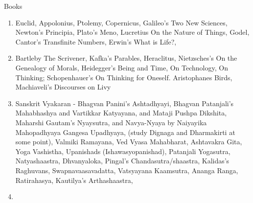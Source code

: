 \documentclass{article}
\begin{document}
Books
\begin{enumerate}
\item Euclid, Appolonius, Ptolemy, Copernicus, Galileo's Two New Sciences, Newton's Principia, Plato's Meno, Lucretius On the Nature of Things, Godel, Cantor's Transfinite Numbers, Erwin's What is Life?, 

\item Bartleby The Scrivener, Kafka's Parables, Heraclitus, Nietzsches's On the Genealogy of Morals, Heidegger's Being and Time, On Technology, On Thinking; Schopenhauer's On Thinking for Oneself. Aristophanes Birds, Machiaveli's Discourses on Livy
\item Sanskrit Vyakaran - Bhagvan Panini's Ashtadhyayi, Bhagvan Patanjali's Mahabhashya and Vartikkar Katyayana, and Mataji Pushpa Dikshita, Maharshi Gautam's Nyaysutra, and Navya-Nyaya by Naiyayika Mahopadhyaya Gangesa Upadhyaya, (study Dignaga and Dharmakirti at some point), Valmiki Ramayana, Ved Vyasa Mahabharat, Ashtavakra Gita, Yoga Vashistha, Upanishads (Ishawasyopanishad), Patanjali Yogasutra, Natyashaastra, Dhvanyaloka, Pingal's Chandasutra/shaastra, Kalidas's Raghuvans, Swapnavaasavadatta, Vatsyayana Kaamsutra, Ananga Ranga, Ratirahasya, Kautilya's Arthashaastra, 
\item 
\end{enumerate}
\end{document}

